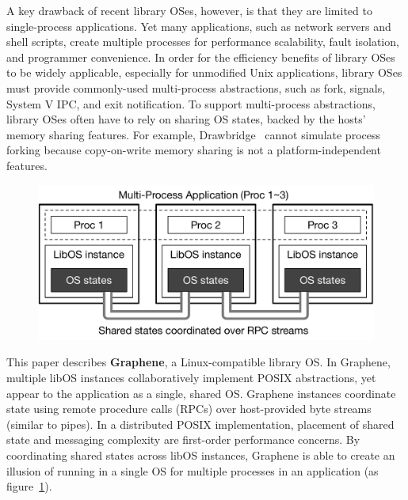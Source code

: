 A key drawback of recent library OSes, however,
is that they are limited to single-process applications.
Yet many applications, such as network servers and
shell scripts,
create multiple processes
for
performance scalability, fault isolation, and programmer convenience.
In order for the efficiency benefits of library OSes to be widely applicable,
especially for unmodified Unix applications,
library OSes must  provide commonly-used multi-process abstractions,
such as fork,  signals, System V IPC, and exit notification.
To support multi-process abstractions, library OSes often have to rely on sharing OS states,
backed by the hosts' memory sharing features.
For example, Drawbridge~\citep{porter11drawbridge} cannot simulate process forking because copy-on-write memory sharing is not a platform-independent features.


\begin{figure}[t!]
\centering
\includegraphics[width=0.75\linewidth]{graphene/figures/concept.pdf}
\caption{
\label{fig:concept}}
\end{figure}

This paper describes {\bf Graphene},  a Linux-compatible library OS.
In Graphene, multiple libOS instances collaboratively implement
POSIX abstractions,
yet appear to the application
as a single, shared OS.
Graphene instances coordinate state using remote procedure calls (RPCs) over
host-provided byte streams (similar to pipes).
In a distributed POSIX implementation, placement of shared state and messaging complexity
are first-order performance concerns.
By coordinating shared states across libOS instances,
Graphene is able to create an illusion 
of running in a single OS
for multiple processes in an application (as figure~\ref{fig:concept}).

